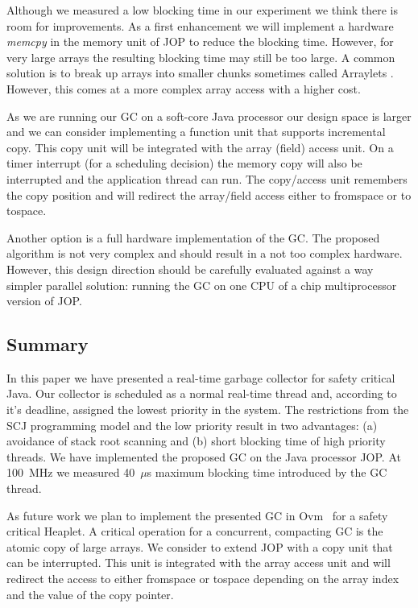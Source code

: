
Although we measured a low blocking time in our experiment we think
there is room for improvements. As a first enhancement we will
implement a hardware \emph{memcpy} in the memory unit of JOP to
reduce the blocking time. However, for very large arrays the
resulting blocking time may still be too large. A common solution is
to break up arrays into smaller chunks sometimes called Arraylets
\cite{Bacon03}. However, this comes at a more complex array access
with a higher cost.

As we are running our GC on a soft-core Java processor our design
space is larger and we can consider implementing a function unit
that supports incremental copy. This copy unit will be integrated
with the array (field) access unit. On a timer interrupt (for a
scheduling decision) the memory copy will also be interrupted and
the application thread can run. The copy/access unit remembers the
copy position and will redirect the array/field access either to
fromspace or to tospace.

Another option is a full hardware implementation of the GC. The
proposed algorithm is not very complex and should result in a not
too complex hardware. However, this design direction should be
carefully evaluated against a way simpler parallel solution: running
the GC on one CPU of a chip multiprocessor version of JOP.

\subsection{Summary} \label{sec:concl}

In this paper we have presented a real-time garbage collector for
safety critical Java. Our collector is scheduled as a normal
real-time thread and, according to it's deadline, assigned the
lowest priority in the system. The restrictions from the SCJ
programming model and the low priority result in two advantages: (a)
avoidance of stack root scanning and (b) short blocking time of high
priority threads. We have implemented the proposed GC on the Java
processor JOP. At 100~MHz we measured 40~$\mu$s maximum blocking
time introduced by the GC thread.

As future work we plan to implement the presented GC in
Ovm~\cite{tecs:06} for a safety critical Heaplet. A critical
operation for a concurrent, compacting GC is the atomic copy of
large arrays. We consider to extend JOP with a copy unit that can be
interrupted. This unit is integrated with the array access unit and
will redirect the access to either fromspace or tospace depending on
the array index and the value of the copy pointer.




